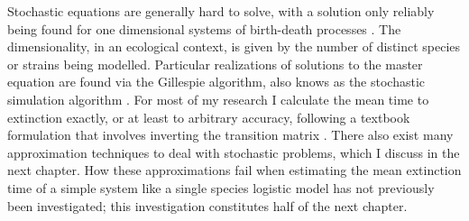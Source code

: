 

Stochastic equations are generally hard to solve, with a solution only reliably being found for one dimensional systems of birth-death processes \cite{Nisbet1982,Gardiner2004a,Hanggi1990}. %
The dimensionality, in an ecological context, is given by the number of distinct species or strains being modelled. 
Particular realizations of solutions to the master equation are found via the Gillespie algorithm, also knows as the stochastic simulation algorithm \cite{Gillespie1977,Cao2006}. 
For most of my research I calculate the mean time to extinction exactly, or at least to arbitrary accuracy, following a textbook formulation that involves inverting the transition matrix \cite{Nisbet1982,Norden1982,Parsons2007,Parsons2010}. 
There also exist many approximation techniques to deal with stochastic problems, which I discuss in the next chapter. 
How these approximations fail when estimating the mean extinction time of a simple system like a single species logistic model has not previously been investigated; this investigation constitutes half of the next chapter. 




